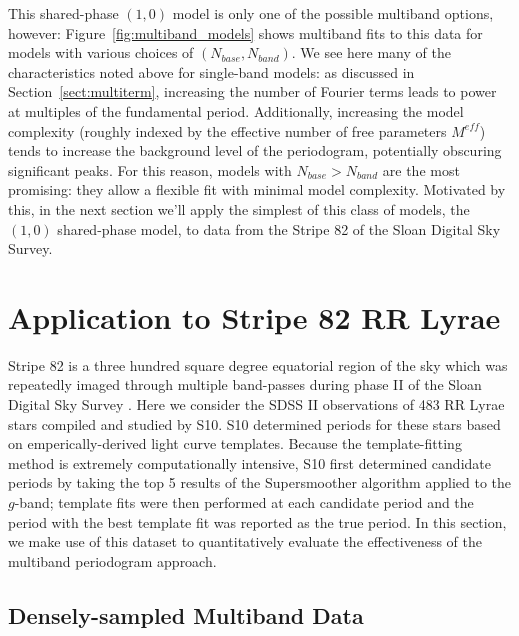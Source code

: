 \documentclass[12pt,preprint]{aastex}
\newcommand{\Fig}[1]{Figure~\ref{fig:#1}}
\newcommand{\fig}[1]{\Fig{#1}}
\newcommand{\Sect}[1]{Section~\ref{sect:#1}}
\newcommand{\sect}[1]{\Sect{#1}}
\newcommand{\sectlabel}[1]{\label{sect:#1}}
\begin{document}
This shared-phase $(1,0)$ model is only one of the possible multiband options, however: \fig{multiband_models} shows multiband fits to this data for models with various choices of $(N_{base},N_{band})$. We see here many of the characteristics noted above for single-band models: as discussed in \sect{multiterm}, increasing the number of Fourier terms leads to power at multiples of the fundamental period. Additionally, increasing the model complexity (roughly indexed by the effective number of free parameters $M^{eff}$) tends to increase the background level of the periodogram, potentially obscuring significant peaks. For this reason, models with $N_{base} > N_{band}$ are the most promising: they allow a flexible fit with minimal model complexity. Motivated by this, in the next section we'll apply the simplest of this class of models, the $(1, 0)$ shared-phase model, to data from the Stripe 82 of the Sloan Digital Sky Survey.


\section{Application to Stripe 82 RR Lyrae}
\sectlabel{stripe82}
Stripe 82 is a three hundred square degree equatorial region of the sky which was repeatedly imaged through multiple band-passes during phase II of the Sloan Digital Sky Survey \citep[SDSS II, see][]{Sesar2007}.
Here we consider the SDSS II observations of 483 RR Lyrae stars compiled and studied by S10.
S10 determined periods for these stars based on emperically-derived light curve templates. Because the template-fitting method is extremely computationally intensive, S10 first determined candidate periods by taking the top 5 results of the Supersmoother \citep{Reimann94} algorithm applied to the $g$-band; template fits were then performed at each candidate period and the period with the best template fit was reported as the true period. In this section, we make use of this dataset to quantitatively evaluate the effectiveness of the multiband periodogram approach.

\subsection{Densely-sampled Multiband Data}
\end{document}
